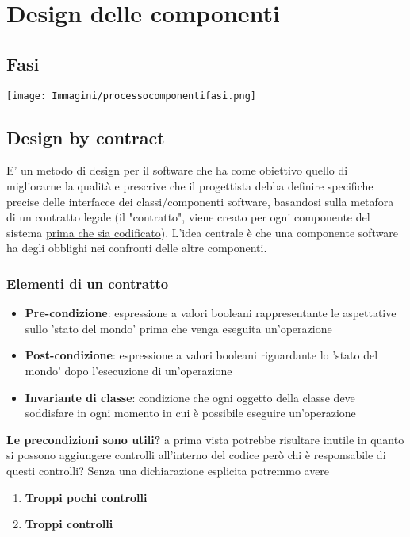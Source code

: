 \documentclass[12pt, a4paper]{report}
\begin{document}
\chapter{Design delle componenti}
\section{Fasi}
\begin{center}
    \texttt{[image: Immagini/processocomponentifasi.png]}
\end{center}
\section{Design by contract}
E' un metodo di design per il software che ha come obiettivo quello  di migliorarne la qualità e prescrive che il progettista debba definire specifiche precise delle interfacce dei classi/componenti software, basandosi sulla metafora di un contratto legale (il "contratto", viene creato per ogni componente del sistema \underline{prima che sia codificato}). L'idea centrale è che una componente software ha degli obblighi nei confronti delle altre componenti.
\subsection{Elementi di un contratto}
\begin{itemize}
    \item \textbf{Pre-condizione}: espressione a valori booleani rappresentante le aspettative sullo 'stato del mondo' prima che venga eseguita un'operazione
    \item \textbf{Post-condizione}: espressione a valori booleani riguardante lo 'stato del mondo' dopo l'esecuzione di un'operazione
    \item \textbf{Invariante di classe}: condizione che ogni oggetto della classe deve soddisfare in ogni momento in cui è possibile eseguire un'operazione
\end{itemize}
\textbf{Le precondizioni sono utili?} a prima vista potrebbe risultare inutile in quanto si possono aggiungere controlli all'interno del codice però chi è responsabile di questi controlli? Senza una dichiarazione esplicita  potremmo avere \begin{enumerate}
    \item \textbf{Troppi pochi controlli}
    \item \textbf{Troppi controlli}
\end{enumerate}
\end{document}
